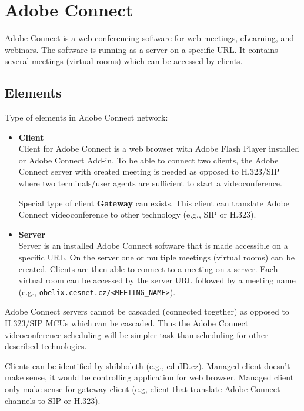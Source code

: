 \documentclass[a4paper]{report}
\begin{document}
\section{Adobe Connect}

Adobe Connect is a web conferencing software for web meetings, eLearning, and webinars. The software is running as a server on a specific URL. It contains several meetings (virtual rooms) which can be accessed by clients.

\subsection{Elements}

Type of elements in Adobe Connect network:

\begin{itemize}
\item \textbf{Client} \\
Client for Adobe Connect is a web browser with Adobe Flash Player installed or Adobe Connect Add-in. To be able to connect two clients, the Adobe Connect server with created meeting is needed as opposed to H.323/SIP  where two terminals/user agents are sufficient to start a videoconference.

Special type of client \textbf{Gateway} can exists. This client can translate Adobe Connect videoconference to other technology (e.g., SIP or H.323).

\item \textbf{Server} \\
Server is an installed Adobe Connect software that is made accessible on a specific URL. On the server one or multiple meetings (virtual rooms) can be created. Clients are then able to connect to a meeting on a server. Each virtual room can be accessed by the server URL followed by a meeting name (e.g., \verb|obelix.cesnet.cz/<MEETING_NAME>|).
\end{itemize}

Adobe Connect servers cannot be cascaded (connected together) as opposed to H.323/SIP MCUs which can be cascaded. Thus the Adobe Connect videoconference scheduling will be simpler task than scheduling for other described technologies.

Clients can be identified by shibboleth (e.g., eduID.cz). Managed client doesn't make sense, it would be controlling application for web browser. Managed client only make sense for gateway client (e.g, client that translate Adobe Connect channels to SIP or H.323).
\end{document}
